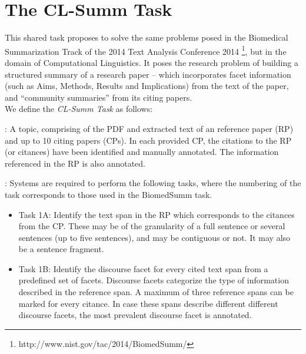 \documentclass[11pt]{article}
\begin{document}

\section{The CL-Summ Task}
This shared task proposes to solve the same problems posed in the Biomedical Summarization Track of the
2014 Text Analysis Conference 2014 \footnote{http://www.nist.gov/tac/2014/BiomedSumm/}, but in the 
domain of Computational Linguistics. It poses the research problem of building a structured 
summary of a research paper -- which incorporates facet information (such as Aims, Methods, 
Results and Implications) from the text of the paper, and ``community summaries'' from its 
citing papers. \\

\noindent We define the {\it CL-Summ Task} as follows:

: A topic, comprising of the PDF and extracted
text of an reference paper (RP) and up to 10 citing papers (CPs).  In
each provided CP, the citations to the RP (or citances) have been
identified and manually annotated. The information referenced in the
RP is also annotated.

: Systems are required to perform the following
tasks, where the numbering of the task corresponds to those used in
the BiomedSumm task.

\begin{itemize}
\item Task 1A: Identify the text span in the RP which corresponds to the citances from the CP. 
  These may be of the granularity of a full   sentence or several sentences (up to five sentences), 
  and may be contiguous or not. It may also be a sentence fragment.
\vspace{-.3cm}
\item Task 1B: Identify the discourse facet for every cited text span from a predefined set of 
  facets. Discourse facets categorize the type of information described in the reference span. 
  A maximum of three reference spans can be marked for every citance. In case these spans describe 
  different different discourse facets, the most prevalent discourse facet is annotated.
\end{itemize}
\end{document}
